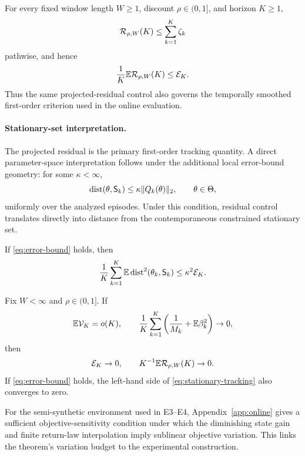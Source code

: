 \begin{corollary}\label{cor:dynamic-local-regret}
For every fixed window length $W\ge1$, discount $\rho\in(0,1]$, and horizon $K\ge1$,
\begin{equation}\label{eq:dynamic-local-regret-bound}
 \mathcal R_{\rho,W}(K)
 \le \sum_{k=1}^{K}\zeta_k
\end{equation}
pathwise, and hence
\begin{equation}\label{eq:average-dynamic-local-regret-bound}
 \frac1K\mathbb E\mathcal R_{\rho,W}(K)
 \le \mathcal E_K.
\end{equation}
Thus the same projected-residual control also governs the temporally smoothed first-order criterion used in the online evaluation.
\end{corollary}

\paragraph{Stationary-set interpretation.}
The projected residual is the primary first-order tracking quantity.  A direct parameter-space interpretation follows under the additional local error-bound geometry: for some $\kappa<\infty$,
\begin{equation}\label{eq:error-bound}
 \operatorname{dist}(\theta,\mathsf S_k)
 \le \kappa\lVert Q_k(\theta)\rVert_2,
 \qquad \theta\in\Theta,
\end{equation}
uniformly over the analyzed episodes.  Under this condition, residual control translates directly into distance from the contemporaneous constrained stationary set.

\begin{corollary}\label{cor:stationary-tracking}
If \eqref{eq:error-bound} holds, then
\begin{equation}\label{eq:stationary-tracking}
 \frac1K\sum_{k=1}^{K}
 \mathbb E\operatorname{dist}^2(\theta_k,\mathsf S_k)
 \le\kappa^2\mathcal E_K.
\end{equation}
\end{corollary}

\begin{corollary}\label{cor:vanishing-tracking}
Fix $W<\infty$ and $\rho\in(0,1]$.  If
\begin{equation}\label{eq:vanishing-conditions}
 \mathbb E\mathcal V_K=o(K),
 \qquad
 \frac1K\sum_{k=1}^{K}
 \left(\frac1{M_k}+\mathbb E\beta_k^2\right)\to0,
\end{equation}
then
\begin{equation}\label{eq:vanishing-conclusion}
 \mathcal E_K\to0,
 \qquad
 K^{-1}\mathbb E\mathcal R_{\rho,W}(K)\to0.
\end{equation}
If \eqref{eq:error-bound} holds, the left-hand side of \eqref{eq:stationary-tracking} also converges to zero.
\end{corollary}

For the semi-synthetic environment used in E3--E4, Appendix~\ref{app:online} gives a sufficient objective-sensitivity condition under which the diminishing state gain and finite return-law interpolation imply sublinear objective variation.  This links the theorem's variation budget to the experimental construction.
